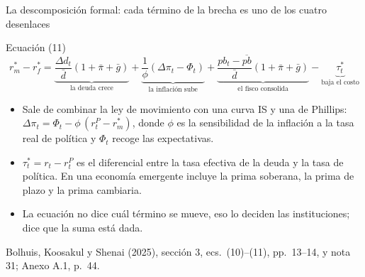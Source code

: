\documentclass[aspectratio=169,11pt]{beamer}
\newcommand{\fuente}[1]{\par\vfill{\small\color{cGris}#1\par}}
\newcommand{\BKS}{Bolhuis, Koosakul y Shenai (2025)}
\begin{document}
\begin{frame}{La descomposición formal: cada término de la brecha es uno de los cuatro desenlaces}
  \begin{block}{Ecuación (11)}
    \[ r_m^* - r_f^* = \underbrace{\frac{\Delta d_t}{\bar d}(1+\bar\pi+\bar g)}_{\text{la deuda crece}} + \underbrace{\frac{1}{\phi}(\Delta\pi_t - \Phi_t)}_{\text{la inflación sube}} + \underbrace{\frac{pb_t - \overline{pb}}{\bar d}(1+\bar\pi+\bar g)}_{\text{el fisco consolida}} - \underbrace{\tau_t^*}_{\text{baja el costo}} \]
  \end{block}
  \begin{itemize}
    \item<2-> Sale de combinar la ley de movimiento con una curva IS y una de Phillips: $\Delta\pi_t = \Phi_t - \phi\,(r^P_t - r_m^*)$, donde $\phi$ es la sensibilidad de la inflación a la tasa real de política y $\Phi_t$ recoge las expectativas.
    \item<3-> $\tau_t^* = r_t - r^P_t$ es el diferencial entre la tasa efectiva de la deuda y la tasa de política. En una economía emergente incluye la prima soberana, la prima de plazo y la prima cambiaria.
    \item<4-> La ecuación no dice cuál término se mueve, eso lo deciden las instituciones; dice que la suma está dada.
  \end{itemize}
  \fuente{\BKS, sección 3, ecs.~(10)--(11), pp.~13--14, y nota 31; Anexo A.1, p.~44.}
\end{frame}
\end{document}
